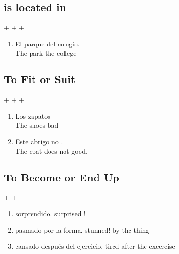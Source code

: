 \documentclass[grid,avery5371]{article}
\begin{document}
\subsection{is located in}


\begin{center}  +  +  +  \end{center}

\begin{enumerate}
    \item El parque   del colegio. \dotfill \\  The park   the college
\end{enumerate}

\subsection{To Fit or Suit }
\begin{center}  +  +  +  \end{center}

\begin{enumerate}
    \item Los zapatos  \\
    The shoes  bad \\
    \item Este abrigo no  .\\
    The coat does not  good. 
\end{enumerate}

\subsection{To Become or End Up}
    \begin{center}  +  +  \end{center}

\begin{enumerate}
    \item {} sorprendido. \dotfill {} surprised !\\
    \item {} pasmado por la forma. \dotfill {} stunned! by the thing\\
    \item {} cansado después del ejercicio. \dotfill  {} tired after the excercise\\
\end{enumerate}
\end{document}

